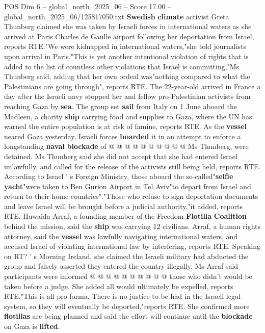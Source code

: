 \begin{textsample}{POS Dim 6 – global\_north\_2025\_06 – Score 17.00 – global\_north\_2025\_06/125817050.txt}  \label{ex:f6_pos_030}
\textbf{Swedish} \textbf{climate} activist Greta Thunberg claimed she was taken by Israeli forces in international waters as she arrived at Paris Charles de Gaulle airport following her deportation from Israel, reports RTE."We were kidnapped in international waters,"she told journalists upon arrival in Paris."This is yet another intentional violation of rights that is added to the list of countless other violations that Israel is committing,"Ms Thunberg said, adding that her own ordeal was"nothing compared to what the Palestinians are going through", reports RTE.
The 22-year-old arrived in France a day after the Israeli navy stopped her and fellow pro-Palestinian activists from reaching Gaza by \textbf{sea}.
The group set \textbf{sail} from Italy on 1 June aboard the Madleen, a charity \textbf{ship} carrying food and supplies to Gaza, where the UN has warned the entire population is at risk of famine, reports RTE.
As the \textbf{vessel} neared Gaza yesterday, Israeli forces \textbf{boarded} it in an attempt to enforce a longstanding \textbf{naval} \textbf{blockade} of @ @ @ @ @ @ @ @ @ @ Ms Thunberg, were detained.
Ms Thunberg said she did not accept that she had entered Israel unlawfully, and called for the release of the activists still being held, reports RTE.
According to Israel ' s Foreign Ministry, those aboard the so-called"\textbf{selfie} \textbf{yacht}"were taken to Ben Gurion Airport in Tel Aviv"to depart from Israel and return to their home countries"."Those who refuse to sign deportation documents and leave Israel will be brought before a judicial authority,"it added, reports RTE.
Huwaida Arraf, a founding member of the Freedom \textbf{Flotilla} \textbf{Coalition} behind the mission, said the \textbf{ship} was carrying 12 civilians.
Arraf, a human rights attorney, said the \textbf{vessel} was lawfully navigating international waters, and accused Israel of violating international law by interfering, reports RTE.
Speaking on RT? ' s Morning Ireland, she claimed the Israeli military had abducted the group and falsely asserted they entered the country illegally.
Ms Arraf said participants were informed @ @ @ @ @ @ @ @ @ @ those who didn't would be taken before a judge.
She added all would ultimately be expelled, reports RTE."This is all pro forma.
There is no justice to be had in the Israeli legal system, so they will eventually be deported,"reports RTE.
She confirmed more \textbf{flotillas} are being planned and said the effort will continue until the \textbf{blockade} on Gaza is \textbf{lifted}.

\end{textsample}
